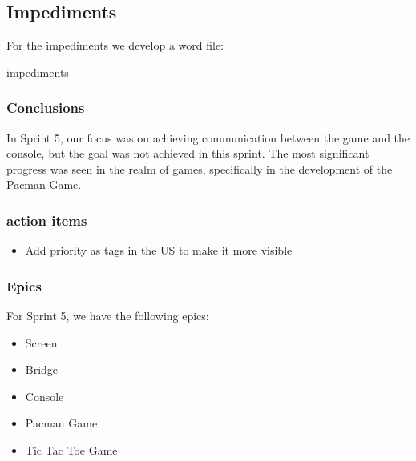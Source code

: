 \subsection{Impediments}
For the impediments we develop a word file:

\href{https://docs.google.com/spreadsheets/d/1S3ndUFktff6ETyNhOyirIFNed71W4ApTLGyjX8xSzUQ/edit?usp=sharing}{impediments}

\subsubsection{Conclusions}

In Sprint 5, our focus was on achieving communication between the game and the console, but the goal was not achieved in this sprint. The most significant progress was seen in the realm of games, specifically in the development of the Pacman Game.

\subsubsection{action items}

\begin{itemize}
    \item Add priority as tags in the US to make it more visible
\end{itemize}


\subsubsection{Epics}

For Sprint 5, we have the following epics:

\begin{itemize}
    \item Screen
    \item Bridge
    \item Console
    \item Pacman Game
    \item Tic Tac Toe Game
\end{itemize}
